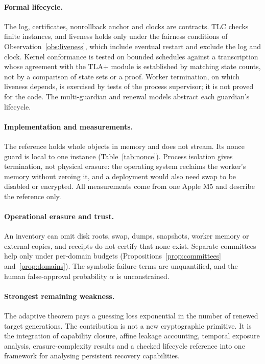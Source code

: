 \documentclass[pdflatex,sn-mathphys-num,twocolumn]{sn-jnl}
\theoremstyle{plain}
\theoremstyle{definition}
\begin{document}
\paragraph{Formal lifecycle.}
The log, certificates, nonrollback anchor and clocks are contracts. TLC checks finite instances, and liveness holds only under the fairness conditions of Observation~\ref{obs:liveness}, which include eventual restart and exclude the log and clock. Kernel conformance is tested on bounded schedules against a transcription whose agreement with the TLA+ module is established by matching state counts, not by a comparison of state sets or a proof. Worker termination, on which liveness depends, is exercised by tests of the process supervisor; it is not proved for the code. The multi-guardian and renewal models abstract each guardian's lifecycle.

\paragraph{Implementation and measurements.}
The reference holds whole objects in memory and does not stream. Its nonce guard is local to one instance (Table~\ref{tab:nonce}). Process isolation gives termination, not physical erasure: the operating system reclaims the worker's memory without zeroing it, and a deployment would also need swap to be disabled or encrypted. All measurements come from one Apple M5 and describe the reference only.

\paragraph{Operational erasure and trust.}
An inventory can omit disk roots, swap, dumps, snapshots, worker memory or external copies, and receipts do not certify that none exist. Separate committees help only under per-domain budgets (Propositions~\ref{prop:committees} and~\ref{prop:domains}). The symbolic failure terms are unquantified, and the human false-approval probability $\alpha$ is unconstrained.

\paragraph{Strongest remaining weakness.}
The adaptive theorem pays a guessing loss exponential in the number of renewed target generations. The contribution is not a new cryptographic primitive. It is the integration of capability closure, affine leakage accounting, temporal exposure analysis, erasure-complexity results and a checked lifecycle reference into one framework for analysing persistent recovery capabilities.
\end{document}
